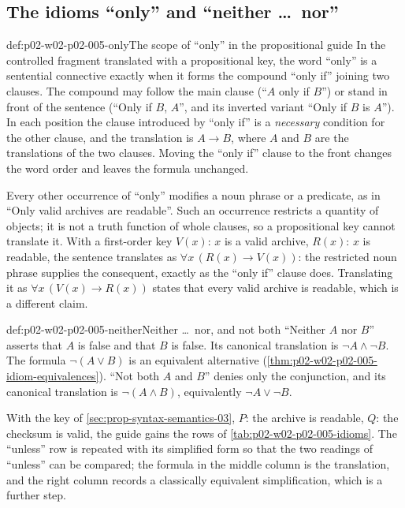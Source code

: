 \subsection{The idioms ``only'' and ``neither \dots\ nor''}
\label{sec:p02-w02-p02-005-only-neither}

\begin{hbconvention}{def:p02-w02-p02-005-only}{The scope of ``only'' in the propositional guide}
In the controlled fragment translated with a propositional key, the word
``only'' is a sentential connective exactly when it forms the compound
``only if'' joining two clauses.  The compound may follow the main clause
(``\(A\) only if \(B\)'') or stand in front of the sentence
(``Only if \(B\), \(A\)'', and its inverted variant ``Only if \(B\) is
\(A\)'').  In each position the clause introduced by ``only if'' is a
\emph{necessary} condition for the other clause, and the translation is
\(A\to B\), where \(A\) and \(B\) are the translations of the two clauses.
Moving the ``only if'' clause to the front changes the word order and
leaves the formula unchanged.

Every other occurrence of ``only'' modifies a noun phrase or a predicate,
as in ``Only valid archives are readable''.  Such an occurrence restricts
a quantity of objects; it is not a truth function of whole clauses, so a
propositional key cannot translate it.  With a first-order key \(V(x)\):
\(x\) is a valid archive, \(R(x)\): \(x\) is readable, the sentence
translates as \(\forall x\,(R(x)\to V(x))\): the restricted noun phrase
supplies the consequent, exactly as the ``only if'' clause does.
Translating it as \(\forall x\,(V(x)\to R(x))\) states that every valid
archive is readable, which is a different claim.
\end{hbconvention}

\begin{hbdefinition}{def:p02-w02-p02-005-neither}{Neither \dots\ nor, and not both}
``Neither \(A\) nor \(B\)'' asserts that \(A\) is false and that \(B\) is
false.  Its canonical translation is \(\neg A\land\neg B\).  The formula
\(\neg(A\lor B)\) is an equivalent alternative
(\cref{thm:p02-w02-p02-005-idiom-equivalences}).  ``Not both \(A\) and
\(B\)'' denies only the conjunction, and its canonical translation is
\(\neg(A\land B)\), equivalently \(\neg A\lor\neg B\).
\end{hbdefinition}

With the key of \cref{sec:prop-syntax-semantics-03}, \(P\): the archive is
readable, \(Q\): the checksum is valid, the guide gains the rows of \cref{tab:p02-w02-p02-005-idioms}.
The ``unless'' row is repeated with its simplified form so that the two
readings of ``unless'' can be compared; the formula in the middle column is
the translation, and the right column records a classically equivalent
simplification, which is a further step.

